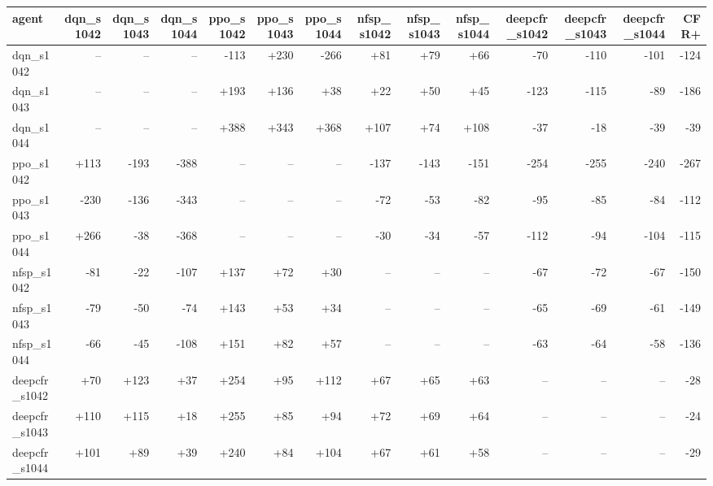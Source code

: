 \begin{tabular}{lrrrrrrrrrrrrr}
\toprule
agent & dqn\_s1042 & dqn\_s1043 & dqn\_s1044 & ppo\_s1042 & ppo\_s1043 & ppo\_s1044 & nfsp\_s1042 & nfsp\_s1043 & nfsp\_s1044 & deepcfr\_s1042 & deepcfr\_s1043 & deepcfr\_s1044 & CFR+ \\
\midrule
dqn\_s1042 & -- & -- & -- & -113 & +230 & -266 & +81 & +79 & +66 & -70 & -110 & -101 & -124 \\
dqn\_s1043 & -- & -- & -- & +193 & +136 & +38 & +22 & +50 & +45 & -123 & -115 & -89 & -186 \\
dqn\_s1044 & -- & -- & -- & +388 & +343 & +368 & +107 & +74 & +108 & -37 & -18 & -39 & -39 \\
ppo\_s1042 & +113 & -193 & -388 & -- & -- & -- & -137 & -143 & -151 & -254 & -255 & -240 & -267 \\
ppo\_s1043 & -230 & -136 & -343 & -- & -- & -- & -72 & -53 & -82 & -95 & -85 & -84 & -112 \\
ppo\_s1044 & +266 & -38 & -368 & -- & -- & -- & -30 & -34 & -57 & -112 & -94 & -104 & -115 \\
nfsp\_s1042 & -81 & -22 & -107 & +137 & +72 & +30 & -- & -- & -- & -67 & -72 & -67 & -150 \\
nfsp\_s1043 & -79 & -50 & -74 & +143 & +53 & +34 & -- & -- & -- & -65 & -69 & -61 & -149 \\
nfsp\_s1044 & -66 & -45 & -108 & +151 & +82 & +57 & -- & -- & -- & -63 & -64 & -58 & -136 \\
deepcfr\_s1042 & +70 & +123 & +37 & +254 & +95 & +112 & +67 & +65 & +63 & -- & -- & -- & -28 \\
deepcfr\_s1043 & +110 & +115 & +18 & +255 & +85 & +94 & +72 & +69 & +64 & -- & -- & -- & -24 \\
deepcfr\_s1044 & +101 & +89 & +39 & +240 & +84 & +104 & +67 & +61 & +58 & -- & -- & -- & -29 \\
\bottomrule
\end{tabular}
